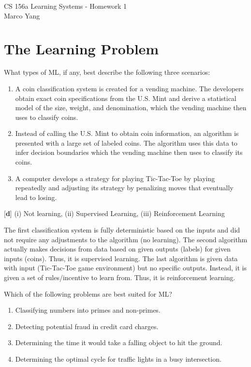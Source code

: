 \documentclass[answers]{exam}
\begin{document}
\begin{center}
{\Large CS 156a Learning Systems - Homework 1} \\
\medskip
Marco Yang \\
\bigskip
\end{center}

\section{The Learning Problem}

\begin{questions}
\question What types of ML, if any, best describe the following three scenarios:

\begin{enumerate}[i]
\item A coin classification system is created for a vending machine. The 
developers obtain exact coin specifications from the U.S. Mint and derive
a statistical model of the size, weight, and denomination, which the vending 
machine then uses to classify coins.
\item Instead of calling the U.S. Mint to obtain coin information, an algorithm 
is presented with a large set of labeled coins. The algorithm uses this data to
infer decision boundaries which the vending machine then uses to classify its 
coins.
\item A computer develops a strategy for playing Tic-Tac-Toe by playing 
repeatedly and adjusting its strategy by penalizing moves that eventually lead
to losing.
\end{enumerate}

\begin{solution}
{[\textbf{d}]} (i) Not learning, (ii) Supervised Learning, (iii) 
Reinforcement Learning

The first classification system is fully deterministic based on the inputs and
did not require any adjustments to the algorithm (no learning). The second 
algorithm actually makes decisions from data based on given outputs (labels) for
given inputs (coins). Thus, it is supervised learning. The last algorithm
is given data with input (Tic-Tac-Toe game environment) but no specific outputs.
Instead, it is given a set of rules/incentive to learn from. Thus, it is 
reinforcement learning.
\end{solution}

\question Which of the following problems are best suited for ML?

\begin{enumerate}[i]
    \item Classifying numbers into primes and non-primes.
    \item Detecting potential fraud in credit card charges.
    \item Determining the time it would take a falling object to hit the ground.
    \item Determining the optimal cycle for traffic lights in a busy intersection. 
\end{enumerate}


\end{questions}
\end{document}
